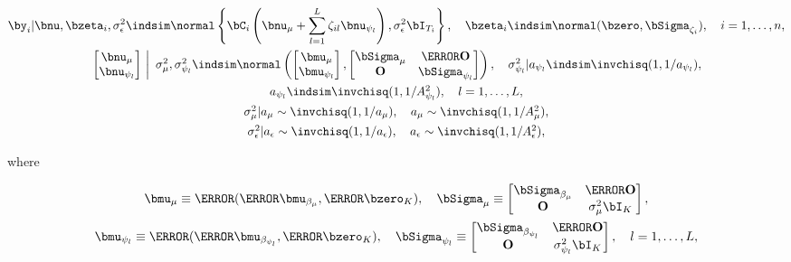 \documentclass[12pt]{article}
\def\sigsqeps{\sigma^2_{\epsilon}}
\def\aeps{a_{\epsilon}}
\def\Asqeps{A_{\epsilon}^2}
\def\sigsqmu{\sigma^2_{\mu}}
\def\amu{a_{\mu}}
\def\Asqmu{A_{\mu}^2}
\def\numu{\bnu_\mu}
\newcommand\nupsi[1]{\bnu_{\psi_{#1}}}
\newcommand\sigsqpsi[1]{\sigma^2_{\psi_{#1}}}
\newcommand\apsi[1]{a_{\psi_{#1}}}
\newcommand\Asqpsi[1]{A_{\psi_{#1}}^2}
\theoremstyle{plain}
\theoremstyle{definition}
\theoremstyle{remark}
\begin{document}
\begin{equation}
\begin{gathered}
	\by_i | \bnu, \bzeta_i, \sigsqeps \indsim \normal \left\{
		\bC_i \left( \numu + \sum_{l=1}^L \zeta_{il} \nupsi{l} \right), \sigsqeps \bI_{T_i}
	\right\}, \quad
	\bzeta_i \indsim \normal (\bzero, \bSigma_{\zeta_i}), \quad
	i = 1, \dots, n, \\
	$$
	\left.\begin{bmatrix}
		\numu \\
		\nupsi{l}
	\end{bmatrix} \ \right| \ \sigsqmu, \sigsqpsi{l}
		\indsim
			\normal \left(
				\begin{bmatrix}
					\bmu_\mu \\
					\bmu_{\psi_l} \\
				\end{bmatrix},
				\begin{bmatrix}
					\bSigma_\mu & \T{\textbf{O}} \\
					\textbf{O} & \bSigma_{\psi_l}
				\end{bmatrix}
			\right), \quad
	\sigsqpsi{l} | \apsi{l} \indsim \invchisq (1, 1/\apsi{l}), \\
	$$
	\apsi{l} \indsim \invchisq (1, 1/\Asqpsi{l}), \quad l = 1, \dots, L, \\
	$$
	\sigsqmu | \amu \sim \invchisq (1, 1/\amu), \quad \amu \sim \invchisq(1, 1/\Asqmu), \\
	$$
	\sigsqeps | \aeps \sim \invchisq (1, 1/\aeps), \quad \aeps \sim \invchisq(1, 1/\Asqeps),
\end{gathered}
\label{bayes_fpca_mod}
\end{equation}

\noindent where

\begin{equation}
\begin{gathered}
	\bmu_\mu \equiv \T{(\T{\bmu_{\beta_\mu}}, \T{\bzero_K})}, \quad
	\bSigma_\mu \equiv \begin{bmatrix}
		\bSigma_{\beta_\mu} & \T{\textbf{O}} \\
		\textbf{O} & \sigsqmu \bI_{K}
	\end{bmatrix}, \\
	$$
	\bmu_{\psi_l} \equiv \T{(\T{\bmu_{\beta_{\psi_l}}}, \T{\bzero_K})}, \quad
	\bSigma_{\psi_l} \equiv \begin{bmatrix}
		\bSigma_{\beta_{\psi_l}} & \T{\textbf{O}} \\
		\textbf{O} & \sigsqpsi{l} \bI_{K}
	\end{bmatrix}, \quad l = 1, \dots, L,
\end{gathered}
\label{sub_vecs_mats}
\end{equation}
\end{document}
